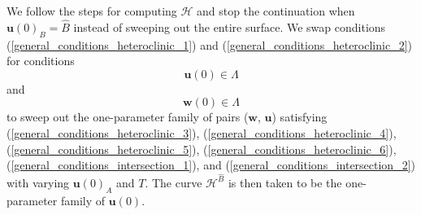 \documentclass{ws-ijbc}
\begin{document}
We follow the steps for computing $\mathscr{H}$ and stop the continuation when $\mathbf{u}(0)_B = \widehat{B}$ instead of sweeping out the entire surface.  We swap conditions (\ref{general_conditions_heteroclinic_1}) and (\ref{general_conditions_heteroclinic_2}) for conditions
	\begin{equation}
		\mathbf{u}(0) \in \Lambda
		\label{general_conditions_intersection_1}
	\end{equation}
and
	\begin{equation}
		\mathbf{w}(0) \in \Lambda
		\label{general_conditions_intersection_2}
	\end{equation}	
to sweep out the one-parameter family of pairs ($\mathbf{w}$, $\mathbf{u}$) satisfying (\ref{general_conditions_heteroclinic_3}), (\ref{general_conditions_heteroclinic_4}), (\ref{general_conditions_heteroclinic_5}), (\ref{general_conditions_heteroclinic_6}), (\ref{general_conditions_intersection_1}), and (\ref{general_conditions_intersection_2}) with varying $\mathbf{u}(0)_A$ and $T$.  The curve $\mathscr{H}^{\widehat{B}}$ is then taken to be the one-parameter family of $\mathbf{u}(0)$.
\end{document}
